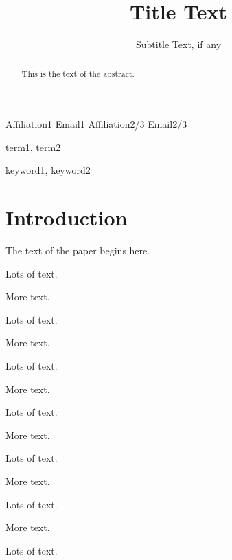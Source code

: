 \documentclass[10pt,numbers]{sigplanconf}
\begin{document}




\title{Title Text}
\subtitle{Subtitle Text, if any}

           {Affiliation1}
           {Email1}
           {Affiliation2/3}
           {Email2/3}

\maketitle

\begin{abstract}
This is the text of the abstract.
\end{abstract}


\terms
term1, term2

\keywords
keyword1, keyword2

\section{Introduction}

The text of the paper begins here.

Lots of text.

More text.

Lots of text.

More text.


Lots of text.

More text.

Lots of text.

More text.


Lots of text.

More text.

Lots of text.

More text.

Lots of text.
\end{document}
